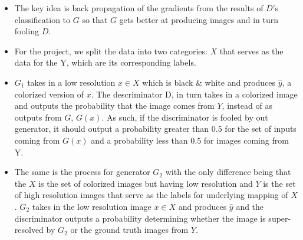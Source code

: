 \documentclass[oneside,a4paper,12pt]{report}
\begin{document}
\begin{itemize}
	\item The key idea is back propagation of the gradients from the results of $D$'s classification to $G$ so that $G$ gets better at producing images and in turn fooling $D$. 
	\item For the project, we split the data into two categories: $X$ that serves as the data for the Y, which are its corresponding labels. 
	\item $G_1$ takes in a low resolution $x\in X$ which is black \& white and produces $\hat{y}$, a colorized version of $x$. The descriminator D, in turn takes in a colorized image and outputs the probability that the image comes from $Y$, instead of as outputs from $G$, $G(x)$. As such, if the discriminator is fooled by out generator, it should output a probability greater than 0.5 for the set of inputs coming from $G(x)$ and a probability less than 0.5 for images coming from Y.
	\item The same is the process for generator $G_2$ with the only difference being that the $X$ is the set of colorized images but having low resolution and $Y$ is the set of high resolution images that serve as the labels for underlying mapping of $X$. $G_2$ takes in the low resolution image $x \in X$ and produces $\hat{y}$ and the discriminator outputs a probability determining whether the image is super-resolved by $G_2$ or the ground truth images from $Y$.
\end{itemize}
\end{document}
